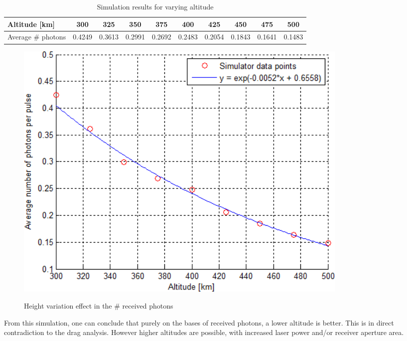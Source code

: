\small
\begin{table}[ht!]
\begin{tabular}{| l | c | c | c | c | c | c | c |c | c |}
	\hline
		Altitude [km] &        300 &     325 &      350 &      375 &     400 &     425 &     450 &     475 &      500 \\
	\hline
		Average \# photons &  0.4249 &  0.3613 &   0.2991 &   0.2692 &  0.2483 &  0.2054 &  0.1843 &  0.1641 &   0.1483 \\
	\hline
\end{tabular}
\caption{Simulation results for varying altitude}
\label{table:simulationHeight}
\end{table} 

\begin{figure}[ht!]
	\centering
		\includegraphics[width=0.8\textwidth]{img/simulationHeight.png}
	\label{fig:simulationHeight}
	\caption{Height variation effect in the \# received photons}
\end{figure}

From this simulation, one can conclude that purely on the bases of received photons, a lower altitude is better. This is in direct contradiction to the drag analysis. However higher altitudes are possible, with increased \ac{laser} power and/or receiver aperture area.
